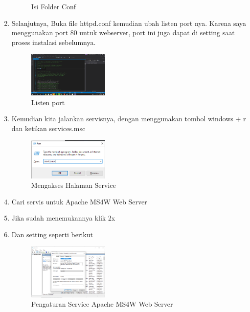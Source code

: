 \begin{enumerate}
\begin{figure}[H]
		\centering
		\caption{Isi Folder Conf}
    \end{figure}
  \item Selanjutnya, Buka file httpd.conf kemudian ubah listen port nya. Karena saya menggunakan port 80 untuk webserver, port ini juga dapat di setting saat proses instalasi sebelumnya.
  \hfill\break
    \begin{figure}[H]
		\includegraphics[width=4cm]{figures/tugas4/1174053/13.png}
		\centering
		\caption{Listen port}
    \end{figure}
  \item Kemudian kita jalankan servisnya, dengan menggunakan tombol windows + r dan ketikan services.msc
  \hfill\break
    \begin{figure}[H]
		\includegraphics[width=4cm]{figures/tugas4/1174053/14.png}
		\centering
		\caption{Mengakses Halaman Service}
    \end{figure}
  \item Cari servis untuk Apache MS4W Web Server
  \item Jika sudah menemukannya klik 2x
  \item Dan setting seperti berikut
  \hfill\break
    \begin{figure}[H]
		\includegraphics[width=4cm]{figures/tugas4/1174053/15.png}
		\centering
		\caption{Pengaturan Service Apache MS4W Web Server}
    \end{figure}
\end{enumerate}
